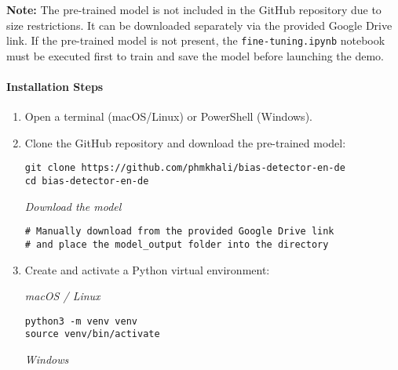   \textbf{Note:} The pre-trained model is not included in the GitHub repository due to size restrictions. It can be downloaded separately via the provided Google Drive link. If the pre-trained model is not present, the \texttt{fine-tuning.ipynb} notebook must be executed first to train and save the model before launching the demo.
   
\paragraph{Installation Steps}

\begin{enumerate}
    \item Open a terminal (macOS/Linux) or PowerShell (Windows).
    
    \item Clone the GitHub repository and download the pre-trained model:
        
    \begin{tcolorbox}[colback=gray!10, colframe=gray!50, breakable, boxrule=0.4pt, sharp corners]
\begin{verbatim}
git clone https://github.com/phmkhali/bias-detector-en-de
cd bias-detector-en-de
\end{verbatim}
    \end{tcolorbox}
    
    \textit{Download the model}
    
    \begin{tcolorbox}[colback=gray!10, colframe=gray!50, breakable, boxrule=0.4pt, sharp corners]
\begin{verbatim}
# Manually download from the provided Google Drive link
# and place the model_output folder into the directory
\end{verbatim}
    \end{tcolorbox}
    
    \item Create and activate a Python virtual environment:
    
    \textit{macOS / Linux}
    
    \begin{tcolorbox}[colback=gray!10, colframe=gray!50, breakable, boxrule=0.4pt, sharp corners]
\begin{verbatim}
python3 -m venv venv
source venv/bin/activate
\end{verbatim}
    \end{tcolorbox}
    
    \textit{Windows}
    

\end{enumerate}

